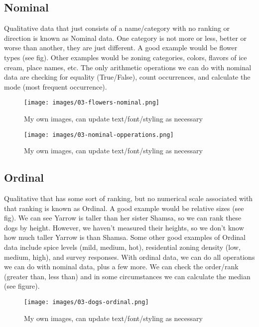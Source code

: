 \documentclass[
]{book}
\begin{document}
\hypertarget{nominal}{%
\subsection{Nominal}\label{nominal}}

Qualitative data that just consists of a name/category with no ranking or direction is known as Nominal data. One category is not more or less, better or worse than another, they are just different. A good example would be flower types (see fig). Other examples would be zoning categories, colors, flavors of ice cream, place names, etc. The only arithmetic operations we can do with nominal data are checking for equality (True/False), count occurrences, and calculate the mode (most frequent occurrence).

\begin{figure}
\centering
\texttt{[image: images/03-flowers-nominal.png]}
\caption{My own images, can update text/font/styling as necessary}
\end{figure}

\begin{figure}
\centering
\texttt{[image: images/03-nominal-opperations.png]}
\caption{My own images, can update text/font/styling as necessary}
\end{figure}

\hypertarget{ordinal}{%
\subsection{Ordinal}\label{ordinal}}

Qualitative that has some sort of ranking, but no numerical scale associated with that ranking is known as Ordinal. A good example would be relative sizes (see fig). We can see Yarrow is taller than her sister Shamsa, so we can rank these dogs by height. However, we haven't measured their heights, so we don't know how much taller Yarrow is than Shamsa. Some other good examples of Ordinal data include spice levels (mild, medium, hot), residential zoning density (low, medium, high), and survey responses. With ordinal data, we can do all operations we can do with nominal data, plus a few more. We can check the order/rank (greater than, less than) and in some circumstances we can calculate the median (see figure).

\begin{figure}
\centering
\texttt{[image: images/03-dogs-ordinal.png]}
\caption{My own images, can update text/font/styling as necessary}
\end{figure}
\end{document}
